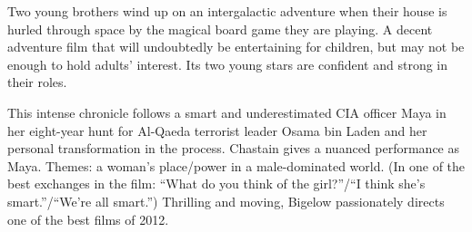    Two young brothers wind up on an intergalactic adventure when their house is hurled through space by the magical board game they are playing. A decent adventure film that will undoubtedly be entertaining for children, but may not be enough to hold adults' interest. Its two young stars are confident and strong in their roles. \author{DW} 

   This intense chronicle follows a smart and underestimated CIA officer Maya in her eight-year hunt for Al-Qaeda terrorist leader Osama bin Laden and her personal transformation in the process. Chastain gives a nuanced performance as Maya. Themes: a woman's place/power in a male-dominated world. (In one of the best exchanges in the film: ``What do you think of the girl?''/``I think she's smart.''/``We're all smart.'') Thrilling and moving, Bigelow passionately directs one of the best films of 2012. \author{AW} 